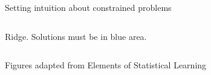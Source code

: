\documentclass[mathserif, handout, aspectratio=169]{beamer}
\begin{document}
\begin{frame}{Setting intuition about constrained problems}
\begin{columns}
\begin{center}
Ridge.  Solutions must be in blue area.
\end{center}

\end{columns}

{\tiny Figures adapted from Elements of Statistical Learning}

\end{frame}
\end{document}
